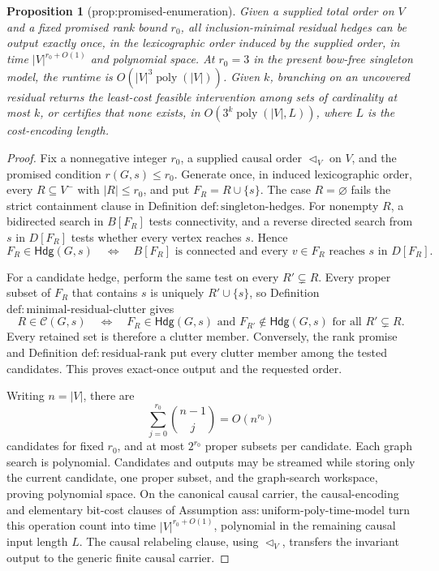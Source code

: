 \documentclass{article}
\newtheorem{proposition}{Proposition}
\begin{document}
\begin{proposition}[prop:promised-enumeration]\label{prop:promised-enumeration}
Given a supplied total order on \(V\) and a fixed promised rank bound \(r_0\), all inclusion-minimal residual hedges can be output exactly once, in the lexicographic order induced by the supplied order, in time \(|V|^{r_0+O(1)}\) and polynomial space. At \(r_0=3\) in the present bow-free singleton model, the runtime is \(O(|V|^3\operatorname{poly}(|V|))\). Given \(k\), branching on an uncovered residual returns the least-cost feasible intervention among sets of cardinality at most \(k\), or certifies that none exists, in \(O(3^k\operatorname{poly}(|V|,L))\), where \(L\) is the cost-encoding length.
\end{proposition}
\begin{proof}
Fix a nonnegative integer \(r_0\), a supplied causal order
\(\triangleleft_V\) on \(V\), and the promised condition
\(r(G,s)\leq r_0\).  Generate once, in induced lexicographic order, every
\(R\subseteq V^{-}\) with \(|R|\leq r_0\), and put
\(F_R=R\cup\{s\}\).  The case \(R=\varnothing\) fails the strict
containment clause in Definition \(\mathrm{def{:}singleton\mbox{-}hedges}\).
For nonempty \(R\), a bidirected search in \(B[F_R]\) tests connectivity,
and a reverse directed search from \(s\) in \(D[F_R]\) tests whether every
vertex reaches \(s\).  Hence
\[
 F_R\in\mathsf{Hdg}(G,s)
 \quad\Longleftrightarrow\quad
 B[F_R]\text{ is connected and every }v\in F_R
 \text{ reaches }s\text{ in }D[F_R].
\]

For a candidate hedge, perform the same test on every
\(R'\subsetneq R\).  Every proper subset of \(F_R\) that contains \(s\)
is uniquely \(R'\cup\{s\}\), so Definition
\(\mathrm{def{:}minimal\mbox{-}residual\mbox{-}clutter}\) gives
\[
 R\in\mathcal C(G,s)
 \quad\Longleftrightarrow\quad
 F_R\in\mathsf{Hdg}(G,s)
 \text{ and }F_{R'}\notin\mathsf{Hdg}(G,s)
 \text{ for all }R'\subsetneq R.
\]
Every retained set is therefore a clutter member.  Conversely, the rank
promise and Definition \(\mathrm{def{:}residual\mbox{-}rank}\) put every
clutter member among the tested candidates.  This proves exact-once output
and the requested order.

Writing \(n=|V|\), there are
\[
 \sum_{j=0}^{r_0}\binom{n-1}{j}=O(n^{r_0})
\]
candidates for fixed \(r_0\), and at most \(2^{r_0}\) proper subsets per
candidate.  Each graph search is polynomial.  Candidates and outputs may be
streamed while storing only the current candidate, one proper subset, and
the graph-search workspace, proving polynomial space.  On the canonical
causal carrier, the causal-encoding and elementary bit-cost clauses of
Assumption \(\mathrm{ass{:}uniform\mbox{-}poly\mbox{-}time\mbox{-}model}\)
turn this operation count into time \(|V|^{r_0+O(1)}\), polynomial in the
remaining causal input length \(L\).  The causal relabeling clause, using
\(\triangleleft_V\), transfers the invariant output to the generic finite
causal carrier.


\end{proof}
\end{document}
